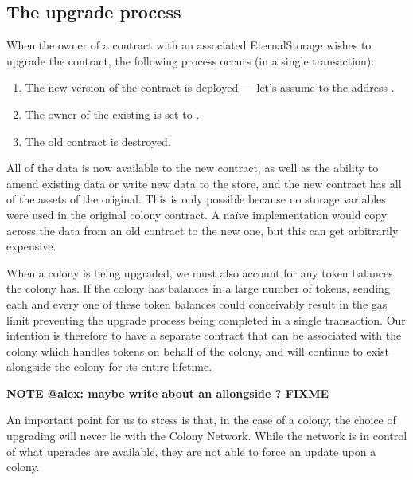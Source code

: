 \subsection{The upgrade process}

When the owner of a contract with an associated EternalStorage wishes to upgrade the contract, the following process occurs (in a single transaction):

\begin{enumerate}
\item The new version of the contract is deployed --- let's assume to the address .
\item The owner of the existing  is set to .
\item The old contract is destroyed.
\end{enumerate}

All of the data is now available to the new contract, as well as the ability to amend existing data or write new data to the store, and the new contract has all of the assets of the original. This is only possible because no storage variables were used in the original colony contract. A na{\"i}ve implementation would copy across the data from an old contract to the new one, but this can get arbitrarily expensive.

When a colony is being upgraded, we must also account for any token balances the colony has. If the colony has balances in a large number of tokens, sending each and every one of these token balances could conceivably result in the gas limit preventing the upgrade process being completed in a single transaction. Our intention is therefore to have a separate contract that can be associated with the colony which handles tokens on behalf of the colony, and will continue to exist alongside the colony for its entire lifetime.

\textbf{NOTE @alex: maybe write about an  allongside ? FIXME}

An important point for us to stress is that, in the case of a colony, the choice of upgrading will never lie with the Colony Network. While the network is in control of what upgrades are available, they are not able to force an update upon a colony.

